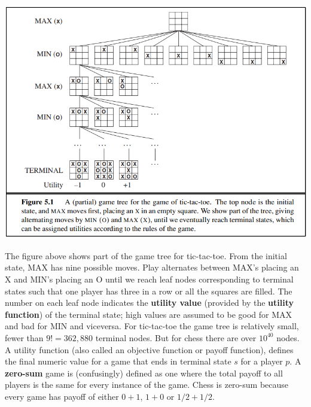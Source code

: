 \begin{center}
    \includegraphics[scale=0.8]{images/tic-tac-toe.png}
\end{center}
The figure above shows part of the game tree for tic-tac-toe. From the initial state, MAX has nine possible moves. Play alternates between MAX’s placing an X and MIN’s placing an O until we reach leaf nodes corresponding to terminal states such that one player has three in a row or all the squares are filled.  The number on each leaf node indicates the \textbf{utility value} (provided by the \textbf{utility function}) of the terminal state; high values are assumed to be good for MAX and bad for MIN and viceversa. For tic-tac-toe the game tree is relatively small, fewer than $9! = 362,880$ terminal nodes. But for chess there are over $10^{40}$ nodes.\newline\newline
A utility function (also called an objective function or payoff function),
defines the final numeric value for a game that ends in terminal state $s$ for a player $p$. A \textbf{zero-sum} game is (confusingly) defined as one where the total payoff to all players is the same for every instance of the game. Chess is zero-sum because every game has payoff of either $0+1$, $1+0$ or $1/2 + 1/2$.

